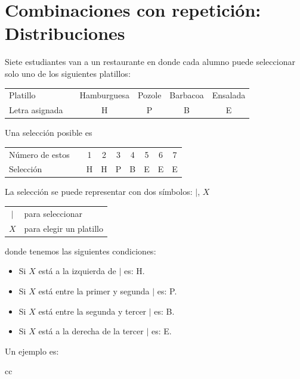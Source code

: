 \section{Combinaciones con repetición: Distribuciones}

\begin{myexample}
    Siete estudiantes van a un restaurante en donde cada alumno puede seleccionar solo uno de los siguientes platillos:
    \begin{center}
        \begin{tabular}{llcccc}
            Platillo & & Hamburguesa & Pozole & Barbacoa & Ensalada \\
            Letra asignada & & H & P & B & E
        \end{tabular}
    \end{center}
    Una selección posible es
    \begin{center}
        \begin{tabular}{llccccccc}
            Número de estos & & 1 & 2 & 3 & 4 & 5 & 6 & 7 \\
            Selección & & H & H & P & B & E & E & E
        \end{tabular}
    \end{center}
    La selección se puede representar con dos símbolos: $\mid$, $X$
    \begin{center}
        \begin{tabular}{cl}
            $\mid$ & para seleccionar \\
            $X$ & para elegir un platillo
        \end{tabular}
    \end{center}
    donde tenemos las siguientes condiciones:
    \begin{itemize}
        \item Si $X$ está a la izquierda de $\mid$ es: H.
        \item Si $X$ está entre la primer y segunda $\mid$ es: P.
        \item Si $X$ está entre la segunda y tercer $\mid$ es: B.
        \item Si $X$ está a la derecha de la tercer $\mid$ es: E.
    \end{itemize}
    Un ejemplo es:
    \begin{center}
        \begin{NiceTabular}[columns-width=3cm,hvlines-except-borders,rules={color=white,width=1pt}]{cc}
        \CodeBefore

\end{NiceTabular}
\end{center}
\end{myexample}
